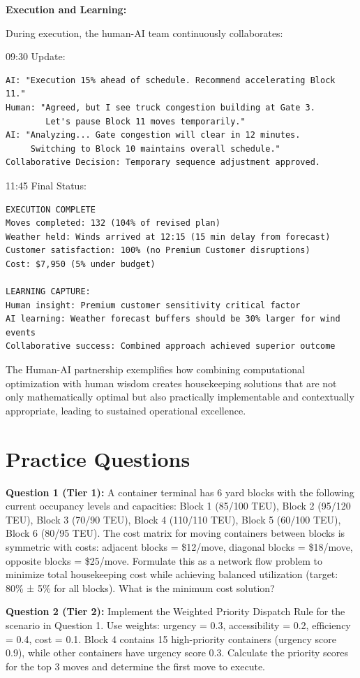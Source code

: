 \documentclass{article}
\begin{document}
\textbf{Execution and Learning:}

During execution, the human-AI team continuously collaborates:

09:30 Update:
\begin{verbatim}
AI: "Execution 15% ahead of schedule. Recommend accelerating Block 11."
Human: "Agreed, but I see truck congestion building at Gate 3. 
        Let's pause Block 11 moves temporarily."
AI: "Analyzing... Gate congestion will clear in 12 minutes. 
     Switching to Block 10 maintains overall schedule."
Collaborative Decision: Temporary sequence adjustment approved.
\end{verbatim}

11:45 Final Status:
\begin{verbatim}
EXECUTION COMPLETE
Moves completed: 132 (104% of revised plan)
Weather held: Winds arrived at 12:15 (15 min delay from forecast)
Customer satisfaction: 100% (no Premium Customer disruptions)
Cost: $7,950 (5% under budget)

LEARNING CAPTURE:
Human insight: Premium customer sensitivity critical factor
AI learning: Weather forecast buffers should be 30% larger for wind events
Collaborative success: Combined approach achieved superior outcome
\end{verbatim}

The Human-AI partnership exemplifies how combining computational optimization with human wisdom creates housekeeping solutions that are not only mathematically optimal but also practically implementable and contextually appropriate, leading to sustained operational excellence.

\section{Practice Questions}

\textbf{Question 1 (Tier 1):} A container terminal has 6 yard blocks with the following current occupancy levels and capacities: Block 1 (85/100 TEU), Block 2 (95/120 TEU), Block 3 (70/90 TEU), Block 4 (110/110 TEU), Block 5 (60/100 TEU), Block 6 (80/95 TEU). The cost matrix for moving containers between blocks is symmetric with costs: adjacent blocks = \$12/move, diagonal blocks = \$18/move, opposite blocks = \$25/move. Formulate this as a network flow problem to minimize total housekeeping cost while achieving balanced utilization (target: 80\% ± 5\% for all blocks). What is the minimum cost solution?

\textbf{Question 2 (Tier 2):} Implement the Weighted Priority Dispatch Rule for the scenario in Question 1. Use weights: urgency = 0.3, accessibility = 0.2, efficiency = 0.4, cost = 0.1. Block 4 contains 15 high-priority containers (urgency score 0.9), while other containers have urgency score 0.3. Calculate the priority scores for the top 3 moves and determine the first move to execute.
\end{document}

